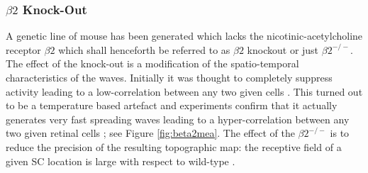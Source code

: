 \subsubsection{$\beta2$  Knock-Out}
A genetic line of mouse has been generated which lacks the nicotinic-acetylcholine receptor $\beta2$ which shall henceforth be referred to as $\beta2$ knockout or just $\beta2^{-/-}$. The effect of the knock-out is a modification of the spatio-temporal characteristics of the waves. Initially it was thought to completely suppress activity leading to a low-correlation between any two given cells \cite{McLaughlin2003-yy}. This turned out to be a temperature based artefact and experiments confirm that it actually generates very fast spreading waves leading to a hyper-correlation between any two given retinal cells \cite{Stafford2009}; see Figure \ref{fig:beta2mea}. The effect of the $\beta2^{-/-}$ is to reduce the precision of the resulting topographic map: the receptive field of a given SC location is large with respect to wild-type \cite{Mrsic-Flogel2005-xp, McLaughlin2003-yy, Chandrasekaran2005-ug}.
